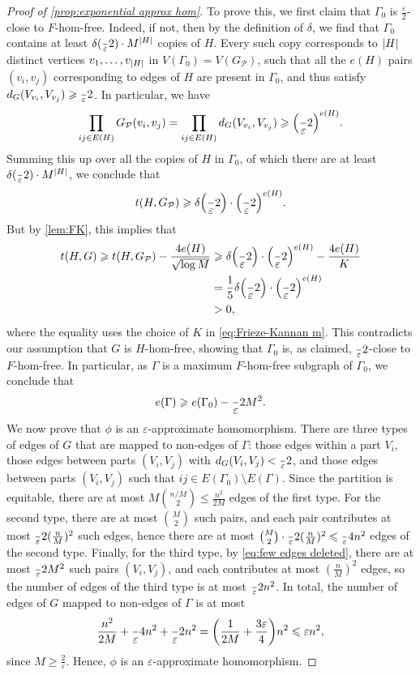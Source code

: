 \documentclass[reqno, english, 12pt]{amsart}
\theoremstyle{plain}
\theoremstyle{remark}
\DeclarePairedDelimiter{\abs}{\lvert}{\rvert}
\renewcommand{\leq}{\leqslant}
\renewcommand{\geq}{\geqslant}
\newcommand{\e}{\ensuremath{\varepsilon}}
\newcommand\p{\mathcal{P}}
\let\originalleft\left
\let\originalright\right
\renewcommand{\left}{\mathopen{}\mathclose\bgroup\originalleft}
\renewcommand{\right}{\aftergroup\egroup\originalright}
\begin{document}
\begin{proof}[Proof of \cref{prop:exponential approx hom}]
	To prove this, we first claim that $\Gamma_0$ is $\frac\varepsilon2$-close to $F$-hom-free. Indeed, if not, then by the definition of $\delta$, we find that $\Gamma_0$ contains at least $\delta(\frac \e 2)\cdot M^{\abs H}$ copies of $H$. Every such copy corresponds to $\abs H$ distinct vertices $v_1,\dots,v_{\abs H}$ in $V(\Gamma_0)=V(G_\p)$, such that all the $e(H)$ pairs $(v_i,v_j)$ corresponding to edges of $H$ are present in $\Gamma_0$, and thus satisfy $d_G(V_{v_i},V_{v_j}) \geq \frac \e 2$. In particular, we have
	\[
	\prod_{ij \in E(H)} G_\p(v_i,v_j) = \prod_{ij \in E(H)} d_G(V_{v_i},V_{v_j}) \geq \left(\frac \e 2\right)^{e(H)}.
	\]
	Summing this up over all the copies of $H$ in $\Gamma_0$, of which there are at least $\delta(\frac \e2)\cdot M^{\abs H}$, we conclude that
	\[
	t(H,G_\p) \geq \delta \left(\frac \e 2\right) \cdot \left(\frac \e 2\right)^{e(H)}.
	\]
	But by \cref{lem:FK}, this implies that
	\begin{align*}
	t(H,G) \geq t(H,G_\p) - \frac{4e(H)}{\sqrt{\log M}} 
	&\geq \delta \left(\frac \e 2\right)\cdot \left(\frac \e 2\right)^{e(H)} - \frac{4e(H)}{K}\\
	&=\frac 15 \delta\left(\frac \e 2\right)\cdot \left(\frac \e 2\right)^{e(H)}\\
	&>0,
	\end{align*}
	where the equality uses the choice of $K$ in \eqref{eq:Frieze-Kannan m}.
	This contradicts our assumption that $G$ is $H$-hom-free, showing that $\Gamma_0$ is, as claimed, $\frac \e2$-close to $F$-hom-free. In particular, as $\Gamma$ is a maximum $F$-hom-free subgraph of $\Gamma_0$, we conclude that
	\begin{equation}\label{eq:few edges deleted}
	e(\Gamma) \geq e(\Gamma_0) - \frac \e 2 M^2.
	\end{equation}
	We now prove that $\phi$ is an $\e$-approximate homomorphism.
	There are three types of edges of $G$ that are mapped to non-edges of $\Gamma$: those edges within a part $V_i$, those edges between parts $(V_i,V_j)$ with $d_G(V_i,V_j)<\frac\e2$, and those edges between parts $(V_i,V_j)$ such that $ij \in E(\Gamma_0) \setminus E(\Gamma)$. Since the partition is equitable, there are at most $M\binom{n/M}2 \leq \frac{n^2}{2M}$ edges of the first type. For the second type, there are at most $\binom M2$ such pairs, and each pair contributes at most $\frac\e2 (\frac nM)^2$ such edges, hence there are at most $\binom M2 \cdot \frac\e 2(\frac nM)^2 \leq \frac \e 4 n^2$ edges of the second type. Finally, for the third type, by \eqref{eq:few edges deleted}, there are at most $\frac \e2 M^2$ such pairs $(V_i,V_j)$, and each contributes at most $(\frac nM)^2$ edges, so the number of edges of the third type is at most $\frac \e 2 n^2$. In total, the number of edges of $G$ mapped to non-edges of $\Gamma$ is at most
	\[
	\frac{n^2}{2M} + \frac \e 4 n^2 + \frac \e 2 n^2 =  \left(\frac{1}{2M} + \frac{3\e}4\right)n^2 \leq \e n^2,
	\]
	since $M \geq \frac 2 {\e}$. Hence, $\phi$ is an $\e$-approximate homomorphism.
\end{proof}
\end{document}
